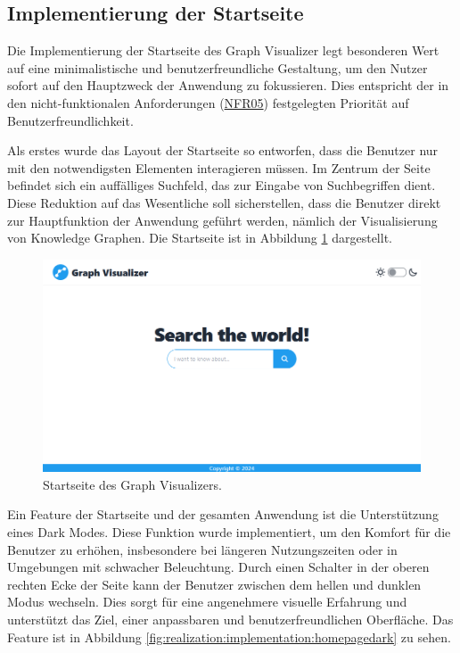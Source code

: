 \subsection{Implementierung der Startseite}

Die Implementierung der Startseite des Graph Visualizer legt besonderen Wert auf eine minimalistische und benutzerfreundliche Gestaltung, um den Nutzer sofort auf den Hauptzweck der Anwendung zu fokussieren. Dies entspricht der in den nicht-funktionalen Anforderungen (\hyperref[NFR05]{NFR05}) festgelegten Priorität auf Benutzerfreundlichkeit.

Als erstes wurde das Layout der Startseite so entworfen, dass die Benutzer nur mit den notwendigsten Elementen interagieren müssen. Im Zentrum der Seite befindet sich ein auffälliges Suchfeld, das zur Eingabe von Suchbegriffen dient. Diese Reduktion auf das Wesentliche soll sicherstellen, dass die Benutzer direkt zur Hauptfunktion der Anwendung geführt werden, nämlich der Visualisierung von Knowledge Graphen. Die Startseite ist in Abbildung \ref{fig:realization:implementation:homepage} dargestellt.

\begin{figure}[h]
    \centering
    \includegraphics[height=.5\textwidth]{images/03/HomePage.png}
    \caption{Startseite des Graph Visualizers.}
    \label{fig:realization:implementation:homepage}
\end{figure}

Ein Feature der Startseite und der gesamten Anwendung ist die Unterstützung eines Dark Modes. Diese Funktion wurde implementiert, um den Komfort für die Benutzer zu erhöhen, insbesondere bei längeren Nutzungszeiten oder in Umgebungen mit schwacher Beleuchtung. Durch einen Schalter in der oberen rechten Ecke der Seite kann der Benutzer zwischen dem hellen und dunklen Modus wechseln. Dies sorgt für eine angenehmere visuelle Erfahrung und unterstützt das Ziel, einer anpassbaren und benutzerfreundlichen Oberfläche. Das Feature ist in Abbildung \ref{fig:realization:implementation:homepagedark} zu sehen.

